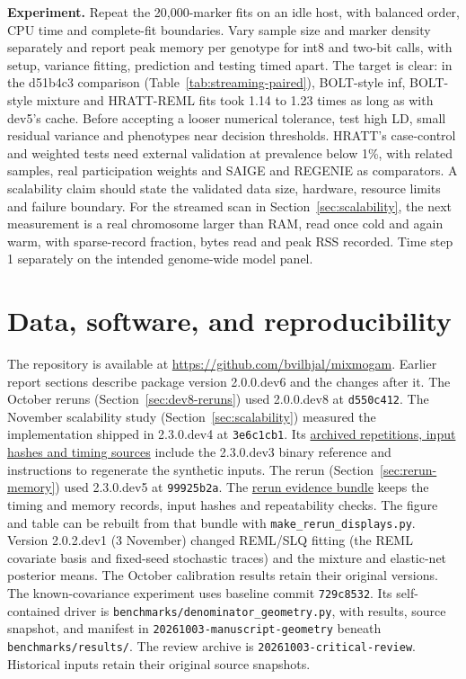 \documentclass[11pt]{article}
\newcommand{\code}[1]{\texttt{#1}}
\begin{document}
\textbf{Experiment.} Repeat the 20,000-marker fits on an idle host, with
balanced order, CPU time and complete-fit boundaries. Vary
sample size and marker density separately and report peak memory per
genotype for int8 and two-bit calls, with setup, variance fitting,
prediction and testing timed apart. The target is clear: in the d51b4c3
comparison (Table~\ref{tab:streaming-paired}), BOLT-style inf, BOLT-style
mixture and HRATT-REML fits took 1.14 to 1.23 times as long as with dev5's
cache. Before accepting a looser
numerical tolerance, test high LD, small residual variance and phenotypes
near decision thresholds. HRATT's case-control and weighted tests need
external validation at prevalence below 1\%, with related samples, real
participation weights and SAIGE and REGENIE as comparators. A scalability
claim should state the validated data size, hardware, resource limits
and failure boundary. For the streamed scan in Section~\ref{sec:scalability},
the next measurement is a real chromosome larger than RAM, read once cold
and again warm, with sparse-record fraction, bytes read and peak RSS
recorded. Time step 1 separately on the intended genome-wide model panel.

\section*{Data, software, and reproducibility}

The repository is available at
\url{https://github.com/bvilhjal/mixmogam}. Earlier report sections describe
package version 2.0.0.dev6 and the changes after it. The October reruns
(Section~\ref{sec:dev8-reruns}) used 2.0.0.dev8 at \code{d550c412}.
The November scalability study (Section~\ref{sec:scalability}) measured
the implementation shipped in 2.3.0.dev4 at \code{3e6c1cb1}. Its
\href{https://github.com/bvilhjal/mixmogam/tree/3e6c1cb167d9c8b0867c7b727b17e24679a996c3/benchmarks/results/20261119-scalability}{archived repetitions, input hashes and timing sources}
include the 2.3.0.dev3 binary reference and instructions to regenerate the
synthetic inputs. The rerun (Section~\ref{sec:rerun-memory}) used
2.3.0.dev5 at \code{99925b2a}. The
\href{https://github.com/bvilhjal/mixmogam/tree/master/benchmarks/results/20261119-dev5-rerun}{rerun evidence bundle}
keeps the timing and memory records, input hashes and repeatability
checks. The figure and table can be rebuilt from that bundle with
\code{make\_rerun\_displays.py}.
Version 2.0.2.dev1
(3 November) changed REML/SLQ fitting (the REML covariate basis and
fixed-seed stochastic traces) and the mixture and elastic-net posterior
means. The October calibration results retain their original versions.
The known-covariance experiment uses baseline commit
\code{729c8532}. Its self-contained driver is
\code{benchmarks/}\allowbreak\code{denominator\_geometry.py}, with results, source snapshot,
and manifest in \code{20261003-}\allowbreak\code{manuscript-}\allowbreak\code{geometry} beneath
\code{benchmarks/results/}. The review archive is
\code{20261003-critical-review}. Historical inputs retain their original
source snapshots.
\end{document}
